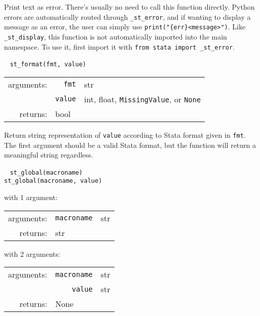 \documentclass{article}
\begin{document}
			\vspace{1.5mm}
			\noindent Print text as error. There's usually no need to call this function directly. Python errors are automatically routed through \lstinline{_st_error}, and if wanting to display a message as an error, the user can simply use \lstinline$print("{err}<message>")$. Like \lstinline{_st_display}, this function is not automatically imported into the main namespace. To use it, first import it with \lstinline{from stata import _st_error}. \newline
			
			
			\ \newline
			\noindent \lstinline$st_format(fmt, value)$
								
			\vspace{1.5mm}
			\noindent 
			\indent \begin{tabular}{rrl}
					arguments: & \texttt{fmt} & str \\
					 & \texttt{value} & int, float, \lstinline$MissingValue$, or \lstinline$None$ \\
					returns: & \multicolumn{2}{l}{bool}
				\end{tabular}
								
			\vspace{1.5mm}
			\noindent Return string representation of \lstinline{value} according to Stata format given in \lstinline{fmt}. The first argument should be a valid Stata format, but the function will return a meaningful string regardless. \newline
			
			
			\ \newline
			\noindent \lstinline$st_global(macroname)$ \\
			\noindent \lstinline$st_global(macroname, value)$
								
			\vspace{1.5mm}
			\noindent 
			\indent with 1 argument:
			
			\indent \qquad \begin{tabular}{rrl}
					arguments: & \texttt{macroname} & str \\
					returns: & \multicolumn{2}{l}{str}
				\end{tabular}
								
			\vspace{1.5mm}
			\noindent
			\indent with 2 arguments:
			
			\indent \qquad \begin{tabular}{rrl}
					arguments: & \texttt{macroname} & str \\
					  & \texttt{value} & str \\
					returns: & \multicolumn{2}{l}{None}
				\end{tabular}
								
\end{document}
